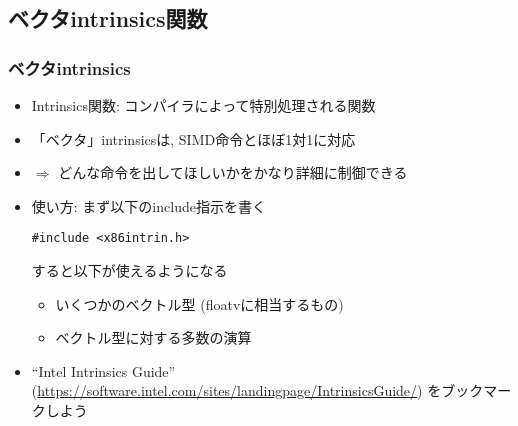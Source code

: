 \documentclass[10pt,dvipdfmx]{beamer}
\newcommand{\ao}[1]{{\color{blue}#1}}
\newcommand{\aka}[1]{{\color{red}#1}}
\begin{document}
\iffalse
\begin{frame}[fragile]
  \frametitle{注意}
  \begin{itemize}
  \item 方法1 (\texttt{float x = v[3]})は, 
    そのような命令があるわけではなく, 遅い場合が多い.
    全てをメモリに一度ストアしてからロードしていたりする
    
  \item 方法3の\verb+_mm256_store_ps(&a[i], v)+
    では, アドレスが32の倍数で
    (32バイト境界にalignされてい)なくてはならない, という制限があり,
    それを破るとSegmentation Faultになる. \aka{以降使わない.}
    
  \item 方法2や, 方法3の\ao{\texttt{\_mm256\_storeu\_ps}}
    にはそのような制限はなく,
    性能のペナルティもないのでこれを使うのを\ao{推奨}

  \item 方法2で\ao{\texttt{\_mm256\_storeu\_ps}}が使われるのは,
    {\tt floatv}を定義する時に
    {\tt aligned(sizeof(float))}としたため. これを省略すると,
    \ao{\texttt{\_mm256\_store\_ps}}を使われてやっかいなことになる
  \end{itemize}
\end{frame}
\fi

\subsection{ベクタintrinsics関数}

\begin{frame}[fragile]
\frametitle{ベクタintrinsics}
\begin{itemize}
\item Intrinsics関数: コンパイラによって特別処理される関数
\item 「ベクタ」intrinsicsは, SIMD命令とほぼ1対1に対応
\item $\Rightarrow$ どんな命令を出してほしいかをかなり詳細に制御できる
\item 使い方: まず以下のinclude指示を書く
\begin{lstlisting}
#include <x86intrin.h>
\end{lstlisting}
すると以下が使えるようになる
\begin{itemize}
\item いくつかのベクトル型 (floatvに相当するもの)
\item ベクトル型に対する多数の演算
\end{itemize}

\item ``Intel Intrinsics Guide''
(\url{https://software.intel.com/sites/landingpage/IntrinsicsGuide/})
をブックマークしよう
\end{itemize}
\end{frame}
\end{document}
